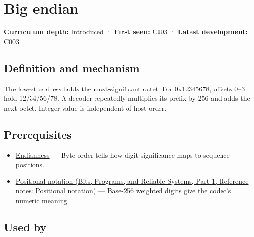 \hypertarget{appendix-92e040df969a}{}\label{referencestart:appendix-92e040df969a}
\section{Big endian}\label{appendix-92e040df969a-big-endian}

\hypertarget{appendix-92e040df969a-big-endian}{}

\textbf{Curriculum depth:} Introduced · \textbf{First seen:} C003 · \textbf{Latest development:} C003

\begin{allmightroledefinition}

\subsection{Definition and mechanism}\label{appendix-92e040df969a-definition-and-mechanism}

\hypertarget{appendix-92e040df969a-definition-and-mechanism}{}

The lowest address holds the most-significant octet. For 0x12345678, offsets 0--3 hold 12/34/56/78. A decoder repeatedly multiplies its prefix by 256 and adds the next octet. Integer value is independent of host order.

\end{allmightroledefinition}

\subsection{Prerequisites}\label{appendix-92e040df969a-prerequisites}

\hypertarget{appendix-92e040df969a-prerequisites}{}

\begin{itemize}
\tightlist
\item
  \hyperref[appendix-bc07c3d25b18]{Endianness} --- Byte order tells how digit significance maps to sequence positions.
\item
  \href{../01-Bits-Programs-and-Reliable-Systems-P01/main.pdf\#nameddest=appendix-83c3f28f7bda}{Positional notation (Bits, Programs, and Reliable Systems, Part 1, Reference notes: Positional notation)} --- Base-256 weighted digits give the codec's numeric meaning.
\end{itemize}

\subsection{Used by}\label{appendix-92e040df969a-used-by}

